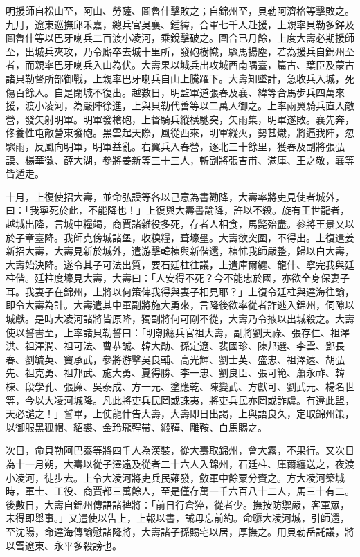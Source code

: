 \begin{pinyinscope}
明援師自松山至，阿山、勞薩、圖魯什擊敗之；自錦州至，貝勒阿濟格等擊敗之。九月，遼東巡撫邱禾嘉，總兵官吳襄、鍾緯，合軍七千人赴援，上親率貝勒多鐸及圖魯什等以巴牙喇兵二百渡小凌河，乘銳擊破之。圍合已月餘，上度大壽必期援師至，出城兵夾攻，乃令廝卒去城十里所，發砲樹幟，驟馬揚塵，若為援兵自錦州至者，而親率巴牙喇兵入山為伏。大壽果以城兵出攻城西南隅臺，篇古、葉臣及蒙古諸貝勒督所部御戰，上親率巴牙喇兵自山上騰躍下。大壽知墜計，急收兵入城，死傷百餘人。自是閉城不復出。越數日，明監軍道張春及襄、緯等合馬步兵四萬來援，渡小凌河，為嚴陣徐進，上與貝勒代善等以二萬人御之。上率兩翼騎兵直入敵營，發矢射明軍。明軍發槍砲，上督騎兵縱橫馳突，矢雨集，明軍遂敗。襄先奔，佟養性屯敵營東發砲。黑雲起天際，風從西來，明軍縱火，勢甚熾，將逼我陣，忽驟雨，反風向明軍，明軍益亂。右翼兵入春營，逐北三十餘里，獲春及副將張弘謨、楊華徵、薛大湖，參將姜新等三十三人，斬副將張吉甫、滿庫、王之敬，襄等皆遁走。

十月，上復使招大壽，並命弘謨等各以己意為書勸降，大壽率將吏見使者城外，曰：「我寧死於此，不能降也！」上復與大壽書諭降，許以不殺。旋有王世龍者，越城出降，言城中糧竭，商賈諸雜役多死，存者人相食，馬斃殆盡。參將王景又以於子章臺降。我師克傍城諸堡，收糗糧，葺壕壘。大壽欲突圍，不得出。上復遣姜新招大壽，大壽見新於城外，遣游擊韓棟與新偕還，棟怵我師嚴整，歸以白大壽，大壽始決降。遂令其子可法出質，要石廷柱往議，上遣庫爾纏、龍什、寧完我與廷柱偕。廷柱度壕見大壽，大壽曰：「人安得不死？今不能忠於國，亦欲全身保妻子耳。我妻子在錦州，上將以何策俾我得與妻子相見耶？」上復令廷柱與達海往諭，即令大壽為計。大壽遣其中軍副將施大勇來，言降後欲率從者詐逃入錦州，伺隙以城獻。是時大凌河諸將皆原降，獨副將何可剛不從，大壽乃令掖以出城殺之。大壽使以誓書至，上率諸貝勒誓曰：「明朝總兵官祖大壽，副將劉天祿、張存仁、祖澤洪、祖澤潤、祖可法、曹恭誠、韓大勛、孫定遼、裴國珍、陳邦選、李雲、鄧長春、劉毓英、竇承武，參將游擊吳良輔、高光輝、劉士英、盛忠、祖澤遠、胡弘先、祖克勇、祖邦武、施大勇、夏得勝、李一忠、劉良臣、張可範、蕭永祚、韓棟、段學孔、張廉、吳泰成、方一元、塗應乾、陳變武、方獻可、劉武元、楊名世等，今以大凌河城降。凡此將吏兵民罔或誅夷，將吏兵民亦罔或詐虞。有違此盟，天必譴之！」誓畢，上使龍什告大壽，大壽即日出謁，上與語良久，定取錦州策，以御服黑狐帽、貂裘、金玲瓏鞓帶、緞鞾、雕鞍、白馬賜之。

次日，命貝勒阿巴泰等將四千人為漢裝，從大壽取錦州，會大霧，不果行。又次日為十一月朔，大壽以從子澤遠及從者二十六人入錦州，石廷柱、庫爾纏送之，夜渡小凌河，徒步去。上令大凌河將吏兵民薙發，斂軍中餘粟分賚之。方大凌河築城時，軍士、工役、商賈都三萬餘人，至是僅存萬一千六百八十二人，馬三十有二。後數日，大壽自錦州傳語諸裨將：「前日行倉猝，從者少。撫按防禦嚴，客軍眾，未得即舉事。」又遣使以告上，上報以書，誡毋忘前約。命隳大凌河城，引師還，至沈陽，命達海傳諭慰諸降將，大壽諸子孫賜宅以居，厚撫之。用貝勒岳託議，將以雪遼東、永平多殺謗也。


\end{pinyinscope}
